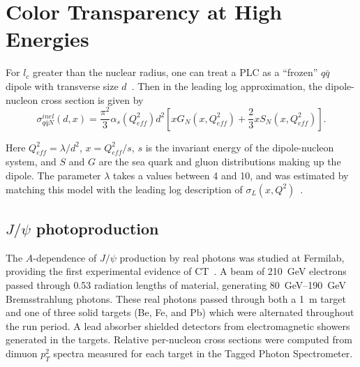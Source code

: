 \section{Color Transparency at High Energies}
\label{sec:ct_high_energies}

For $l_c$ greater than the nuclear radius, one can treat a PLC as a
``frozen'' $q\bar{q}$ dipole with transverse size
$d$~\cite{Blattel_1993, Frankfurt_1993}.
Then in the leading log approximation, the dipole-nucleon cross section is
given by~\cite{Frankfurt_2000, Frankfurt_2002}
\begin{equation} \label{eq:dipole_cross_section}
    \sigma_{q\bar{q} N}^{inel}(d,x) = \frac{\pi^{2}}{3} \alpha_{s}
    \left( Q_{eff}^2 \right) d^2
    \left[
           x G_{N} \left( x, Q_{eff}^2 \right) +
           \frac{2}{3} x S_{N} \left( x, Q_{eff}^2 \right)
    \right].
\end{equation}


Here $Q_{eff}^2=\lambda/d^2$, $x=Q_{eff}^2/s$, $s$ is the invariant energy of
the dipole-nucleon system, and $S$ and $G$ are the sea quark and gluon
distributions making up the dipole.
The parameter $\lambda$ takes a values between 4 and 10, and was estimated by
matching this model with the leading log description of
$\sigma_L(x,Q^2)$~\cite{Frankfurt_1996}.


\subsection{$J/\psi$ photoproduction}
%

The $A$-dependence of $J/\psi$ production by real photons was studied at
Fermilab, providing the first experimental evidence of CT~\cite{Sokoloff_1986}.
A beam of \SI{210}{\giga\electronvolt} electrons passed through 0.53 radiation
lengths of material, generating \SIrange{80}{190}{\giga\electronvolt} Bremsstrahlung
photons.
These real photons passed through both a \SI{1}{\m}  target and one of
three solid targets (Be, Fe, and Pb) which were alternated throughout the run
period.
A lead absorber shielded detectors from electromagnetic showers generated in
the targets.
Relative per-nucleon cross sections were computed from dimuon $p_T^2$ spectra
measured for each target in the Tagged Photon Spectrometer.


